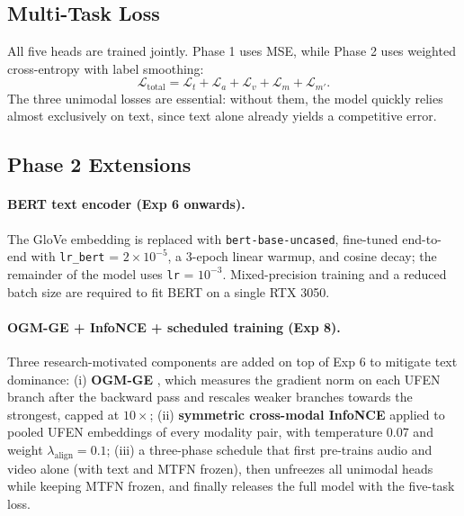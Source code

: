 \documentclass[11pt,twocolumn]{article}
\begin{document}
\subsection{Multi-Task Loss}

All five heads are trained jointly. Phase 1 uses MSE, while Phase 2 uses weighted cross-entropy with label smoothing:
\begin{equation}
\mathcal{L}_{\text{total}} = \mathcal{L}_t + \mathcal{L}_a + \mathcal{L}_v + \mathcal{L}_m + \mathcal{L}_{m'}.
\end{equation}
The three unimodal losses are essential: without them, the model quickly relies almost exclusively on text, since text alone already yields a competitive error.

\subsection{Phase 2 Extensions}

\paragraph{BERT text encoder (Exp 6 onwards).} The GloVe embedding is replaced with \texttt{bert-base-uncased}, fine-tuned end-to-end with \texttt{lr\_bert} = $2 \times 10^{-5}$, a 3-epoch linear warmup, and cosine decay; the remainder of the model uses \texttt{lr} = $10^{-3}$. Mixed-precision training and a reduced batch size are required to fit BERT on a single RTX 3050.

\paragraph{OGM-GE + InfoNCE + scheduled training (Exp 8).} Three research-motivated components are added on top of Exp 6 to mitigate text dominance:
(i) \textbf{OGM-GE} \citep{peng2022ogmge}, which measures the gradient norm on each UFEN branch after the backward pass and rescales weaker branches towards the strongest, capped at $10\times$;
(ii) \textbf{symmetric cross-modal InfoNCE} \citep{vandenoord2018cpc} applied to pooled UFEN embeddings of every modality pair, with temperature 0.07 and weight $\lambda_{\text{align}} = 0.1$;
(iii) a three-phase schedule that first pre-trains audio and video alone (with text and MTFN frozen), then unfreezes all unimodal heads while keeping MTFN frozen, and finally releases the full model with the five-task loss.
\end{document}
